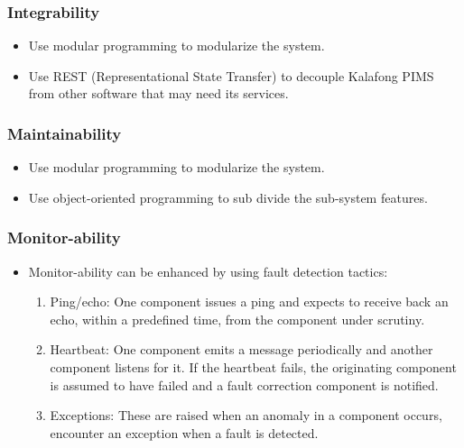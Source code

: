 \subsubsection{Integrability}
	\begin{itemize}
		\item Use modular programming to modularize the system. 
		\item Use REST (Representational State Transfer) to decouple Kalafong PIMS from other software that may need its services.
	\end{itemize}
\subsubsection{Maintainability}
	\begin{itemize}
		\item Use modular programming to modularize the system.
		\item Use object-oriented programming to sub divide the sub-system features.
	\end{itemize}
\subsubsection{Monitor-ability}
	\begin{itemize}
		\item Monitor-ability can be enhanced by using fault detection tactics:
		\begin{enumerate}
			\item Ping/echo: One component issues a ping and expects to receive back an echo, within a predefined time, from the component under scrutiny.
			\item Heartbeat: One component emits a message periodically and another component listens for it. If the heartbeat fails, the originating component is assumed to have failed and a fault correction component is notified.
			\item Exceptions: These are raised when an anomaly in a component occurs, encounter an exception when a fault is detected.
		\end{enumerate}
	\end{itemize}
